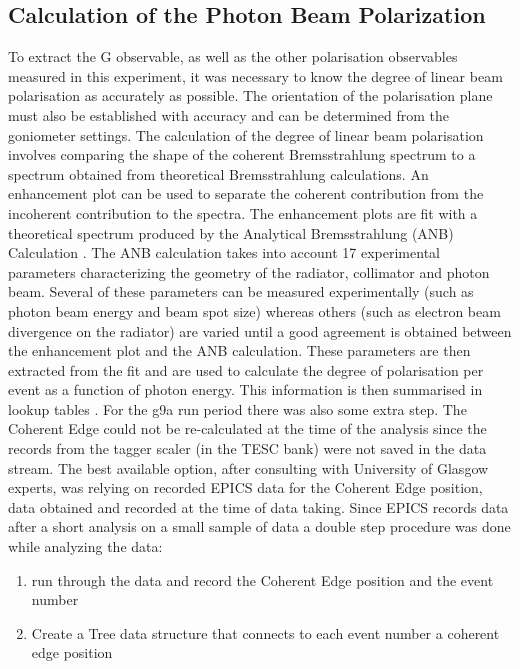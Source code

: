\subsection{Calculation of the Photon Beam Polarization}
To extract the G observable, as well as the other polarisation observables measured in this experiment, it was necessary to know the degree of linear beam polarisation as accurately as possible. The orientation of the polarisation plane must also be established with accuracy and can be determined from the goniometer settings. The calculation of the degree of linear beam polarisation involves comparing the shape of the coherent Bremsstrahlung spectrum to a spectrum obtained from theoretical Bremsstrahlung calculations. An enhancement plot can be used to separate the coherent contribution from the incoherent contribution to the spectra. The enhancement plots are fit with a theoretical spectrum produced by the Analytical Bremsstrahlung (ANB) Calculation \cite{Natter_2003}\cite{Sabin_2010}. The ANB calculation takes into account 17 experimental parameters characterizing the geometry of the radiator, collimator and photon beam. Several of these parameters can be measured experimentally (such as photon beam energy and beam spot size) whereas others (such as electron beam divergence on the radiator) are varied until a good agreement is obtained between the enhancement plot and the ANB calculation. These parameters are then extracted from the fit and are used to calculate the degree of polarisation per event as a function of photon energy. This information is then summarised in lookup tables \cite{Anderson_table}. For the g9a run period there was also some extra step. The Coherent Edge could not be re-calculated at the time of the analysis since the records from the tagger scaler (in the TESC bank) were not saved in the data stream. The best available option, after consulting with University of Glasgow experts, was relying on recorded EPICS data for the Coherent Edge position, data obtained and recorded at the time of data taking. Since EPICS records data after a short analysis on a small sample of data a double step procedure was done while analyzing the data:
\begin{enumerate}
\item run through the data and record the Coherent Edge position and the event number
\item Create a Tree data structure that connects to each event number a coherent edge position 
\end{enumerate}



